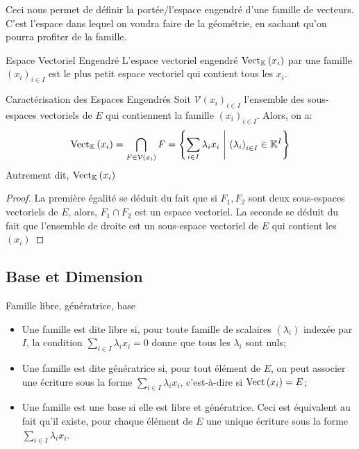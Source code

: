 \documentclass{classe}
\renewcommand*{\K}{\mathbb{K}}
\begin{document}
Ceci nous permet de définir la portée/l'espace engendré d'une famille de vecteurs. C'est l'espace dans lequel on voudra faire de la géométrie, en sachant qu'on pourra profiter de la famille.

\begin{définition}{Espace Vectoriel Engendré}{}
	L'espace vectoriel engendré $\Vect_{\K}\left( x_{i} \right)$ par une famille $\left( x_{i}\right)_{i\in I}$ est le plus petit espace vectoriel qui contient tous les $x_{i}$.
\end{définition}

\begin{propositionfr}{Caractérisation des Espaces Engendrés}{}
	Soit $\mathcal{V}\left( x_{i} \right)_{i\in I}$ l'ensemble des sous-espaces vectoriels de $E$ qui contiennent la famille $\left(x_{i}\right)_{i\in I}$.
	Alors, on a:
	\begin{equation*}
		\Vect_{\K}\left( x_{i} \right) = \bigcap_{F \in \mathcal{V}\left( x_{i} \right)} F = \left\{ \sum_{i\in I}\lambda_{i}x_{i}\ \middle| \ \left(\lambda_{i}\right)_{i\in I} \in \K^{I}\right\}
	\end{equation*}
	Autrement dit, $\Vect_{\K}\left( x_{i} \right)$
\end{propositionfr}
\begin{proof}
	La première égalité se déduit du fait que si $F_{1}, F_{2}$ sont deux sous-espaces vectoriels de $E$, alors, $F_{1} \cap F_{2}$ est un espace vectoriel.
	La seconde se déduit du fait que l'ensemble de droite est un sous-espace vectoriel de $E$ qui contient les $\left( x_{i} \right)$
\end{proof}

\subsection{Base et Dimension}
\begin{définition}{Famille libre, génératrice, base}{}
\begin{itemize}
\item Une famille est dite libre si, pour toute famille de scalaires $(\lambda_i)$ indexée par $I$, la condition $\sum_{i\in I} \lambda_i x_i = 0$ donne que tous les $\lambda_i$ sont nuls;
\item Une famille est dite génératrice si, pour tout élément de $E$, on peut associer une écriture sous la forme $\sum_{i\in I} \lambda_i x_i$, c'est-à-dire si $\operatorname{Vect}\left( x_{i} \right) = E$;
\item Une famille est une base si elle est libre et génératrice. Ceci est équivalent au fait qu'il existe, pour chaque élément de $E$ une unique écriture sous la forme $\sum_{i\in I} \lambda_i x_i$.
\end{itemize}
\end{définition}
\end{document}
